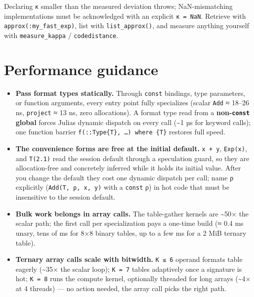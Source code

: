 Declaring \texttt{κ} smaller than the measured deviation throws; NaN-mismatching implementations must be acknowledged with an explicit \texttt{κ = NaN}. Retrieve with \texttt{approx(:my\_fast\_exp)}, list with \texttt{list\_approx()}, and measure anything yourself with \texttt{measure\_kappa} / \texttt{codedistance}.



\section{Performance guidance}



\label{8216999033093502309}{}


\begin{itemize}
\item \textbf{Pass format types statically.} Through \texttt{const} bindings, type parameters, or function arguments, every entry point fully specializes (scalar \texttt{Add} ≈ 18–26 ns, \texttt{project} ≈ 13 ns, zero allocations). A format type read from a \textbf{non-\texttt{const} global} forces Julia{\textquotesingle}s dynamic dispatch on every call ({\textasciitilde}1 µs for keyword calls); one function barrier \texttt{f(::Type\{T\}, …) where \{T\}} restores full speed.


\item \textbf{The convenience forms are free at the initial default.} \texttt{x + y}, \texttt{Exp(x)}, and \texttt{T(2.1)} read the session default through a speculation guard, so they are allocation-free and concretely inferred while it holds its initial value. After you change the default they cost one dynamic dispatch per call; name ρ explicitly (\texttt{Add(T, ρ, x, y)} with a \texttt{const} ρ) in hot code that must be insensitive to the session default.


\item \textbf{Bulk work belongs in array calls.} The table-gather kernels are {\textasciitilde}50× the scalar path; the first call per specialization pays a one-time build (≈ 0.4 ms unary, tens of ms for 8×8 binary tables, up to a few ms for a 2 MiB ternary table).


\item \textbf{Ternary array calls scale with bitwidth.} \texttt{K ≤ 6} operand formats table eagerly ({\textasciitilde}35× the scalar loop); \texttt{K = 7} tables adaptively once a signature is hot; \texttt{K = 8} runs the compute kernel, optionally threaded for long arrays ({\textasciitilde}4× at 4 threads) — no action needed, the array call picks the right path.



\end{itemize}
